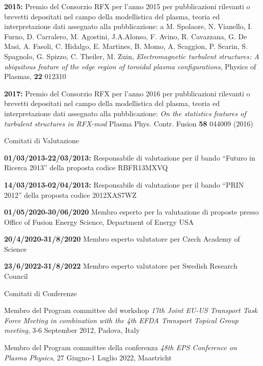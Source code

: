 \begin{enumerate}[label={[M\arabic*]}]
\item \textbf{2015:} Premio del Consorzio RFX per l'anno 2015 per
  pubblicazioni rilevanti o brevetti depositati nel campo della
  modellistica del plasma, teoria ed interpretazione dati assegnato
  alla pubblicazione: a M. Spolaore, N. Vianello, I. Furno,
  D. Carralero,
  M. Agostini, J.A.Alonso, F. Avino, R. Cavazzana, G. De Masi,
  A. Fasoli,
  C. Hidalgo, E.
  Martines, B. Momo, A. Scaggion, P. Scarin, S. Spagnolo, G. Spizzo, C.
Theiler, M. Zuin, \emph{Electromagnetic turbulent structures: A ubiquitous
feature of the edge region of toroidal plasma configurations}, Physics
of Plasmas, \textbf{22} 012310

\item \textbf{2017:} Premio del Consorzio RFX per l'anno 2016 per
  pubblicazioni
  rilevanti o brevetti depositati nel campo della modellistica del
  plasma,
  teoria ed interpretazione dati assegnato alla pubblicazione:
  \emph{On the statistics features of turbulent structures in RFX-mod}
  Plasma Phys. Contr. Fusion \textbf{58} 044009 (2016)
\end{enumerate}
\begin{statementblock}{Comitati di Valutazione}
\end{statementblock}
\nopagebreak
\begin{enumerate}[label={[N\arabic*]}]
\item \textbf{01/03/2013-22/03/2013:} Responsabile di valutazione per
  il bando “Futuro in Ricerca 2013” della proposta codice RBFR13MXVQ
\item \textbf{14/03/2013-02/04/2013:} Responsabile di valutazione
    per il bando “PRIN 2012” della proposta codice 2012XAS7WZ
\item \textbf{01/05/2020-30/06/2020} Membro esperto per la valutazione
  di proposte presso Office of Fusion Energy Science,  Department of
  Energy USA
\item \textbf{20/4/2020-31/8/2020} Membro esperto valutatore per Czech
  Academy of Science  
\item \textbf{23/6/2022-31/8/2022} Membro esperto valutatore per Swedish Research Council 
\end{enumerate}
\begin{statementblock}{Comitati di Conferenze}
\end{statementblock}
\begin{enumerate}[label={[O\arabic*]}]
\item Membro del Program committee del workshop \emph{17th Joint EU-US Transport Task Force
Meeting in combination with the 4th EFDA Transport Topical Group
meeting}, 3-6 September 2012, Padova, Italy
\item Membro del Program committee della conferenza \emph{48th EPS
    Conference on Plasma Physics}, 27 Giugno-1 Luglio 2022, Maastricht 
\end{enumerate}
